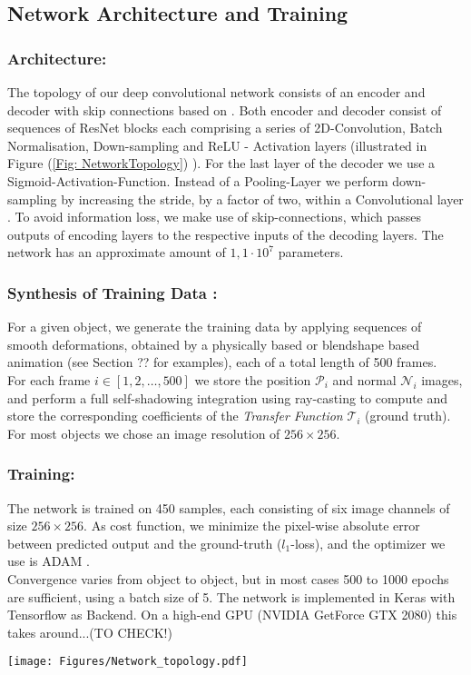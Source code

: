 \subsection{ Network Architecture and Training}
\subsubsection*{Architecture: \\} 
The topology of our deep convolutional network consists of an encoder and decoder with skip connections based on \cite{U-Net}. Both encoder and decoder consist of sequences of ResNet blocks \cite{ResNet} each comprising a series of 2D-Convolution, Batch Normalisation, Down-sampling and ReLU - Activation layers (illustrated in Figure (\ref{Fig: NetworkTopology}) ). For the last layer of the decoder we use a Sigmoid-Activation-Function. Instead of a Pooling-Layer we perform down-sampling by increasing the stride, by a factor of two, within a Convolutional layer \cite{StridingConv}. To avoid information loss,  we make use of skip-connections, which passes outputs of encoding layers to the respective inputs of the decoding layers. The network has an approximate amount of $1,1 \cdot 10^7$ parameters. 
\subsubsection*{Synthesis of Training Data :\\}
For a given object, we generate the training data by applying sequences of smooth deformations, obtained by a physically based or blendshape based animation (see Section ?? for examples), each of a total length of 500 frames. 
\\
For each frame $i \in [1,2,\dots,500]$ we store the position $\mathcal{P}_i$  and normal $\mathcal{N}_i$ images, and perform a full self-shadowing integration using ray-casting to compute and store the corresponding coefficients of the \textit{Transfer Function} $\mathcal{T}_i$ (ground truth).
\\
For most objects we chose an image resolution of $256 \times 256$. 
\subsubsection*{Training: \\} 
The network is trained on 450 samples, each consisting of six image channels of size $256 \times 256$. As cost function, we minimize the pixel-wise absolute error between predicted output and the ground-truth ($l_1$-loss), and the optimizer we use is ADAM \cite{ADAM}. 
\\
Convergence varies from object to object, but in most cases 500 to 1000 epochs are sufficient, using a batch size of 5. The network is implemented in Keras \cite{Keras} with Tensorflow as Backend. On a high-end GPU (NVIDIA GetForce GTX 2080) this takes around...(TO CHECK!)
\begin{figure*}[t]
  \centering
    \texttt{[image: Figures/Network\_topology.pdf]}
     \caption{Network Topology}
     \label{Fig: NetworkTopology}
\end{figure*}

  


